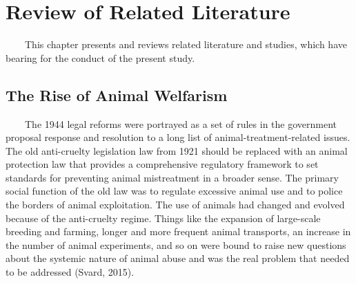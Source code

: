 \chapter{Review of Related Literature}
\label{sec:relatedlit}

~~~~This chapter presents and reviews related literature and studies, which have bearing for the conduct of the present study. 

\begin{comment}
%
%
Guide on Writing your RRL chapter
 
1. Identify the keywords with respect to your research
      One keyword = One document section
                Examples: 2.1 Story Generation Systems
			 2.2 Knowledge Representation

2.  Find references using these keywords

3.  For each of the references that you find,
        Check: Is it relevant to your research?
        Use their references to find more relevant works.

4. Identify a set of criteria for comparison.
       It will serve as a guide to help you focus on what to look for

5. Write a summary focusing on -
       What: A short description of the work
       How: A summary of the approach it utilized
       Findings: If applicable, provide the results
        Why: Relevance to your work

6. At the end of each section,  show a Table of Comparison of the related works 
   and your proposed project/system

\end{comment}

\section{The Rise of Animal Welfarism}
~~~~The 1944 legal reforms were portrayed as a set of rules in the government proposal response and resolution to a long list of animal-treatment-related issues. The old anti-cruelty legislation law from 1921 should be replaced with an animal protection law that provides a comprehensive regulatory framework to set standards for preventing animal mistreatment in a broader sense.
The primary social function of the old law was to regulate excessive animal use and to police the borders of animal exploitation. The use of animals had changed and evolved because of the anti-cruelty regime. Things like the expansion of large-scale breeding and farming, longer and more frequent animal transports, an increase in the number of animal experiments, and so on were bound to raise new questions about the systemic nature of animal abuse and was the real problem that needed to be addressed (Svard, 2015).

